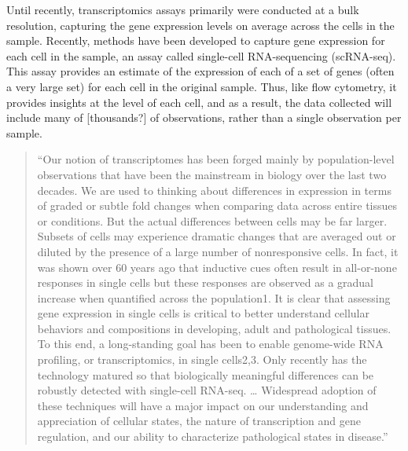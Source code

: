 \documentclass[
]{book}
\begin{document}
Until recently, transcriptomics assays primarily were conducted at a
bulk resolution, capturing the gene expression levels on average across the
cells in the sample. Recently, methods have been developed to capture
gene expression for each cell in the sample, an assay called single-cell
RNA-sequencing (scRNA-seq). This assay provides an estimate of the expression
of each of a set of genes (often a very large set) for each cell in the
original sample. Thus, like flow cytometry, it provides insights at the
level of each cell, and as a result, the data collected will include many
of {[}thousands?{]} of observations, rather than a single observation per
sample.

\begin{quote}
``Our notion of transcriptomes has been forged mainly by population-level
observations that have been the mainstream in biology over the last two decades.
We are used to thinking about differences in expression in terms of graded or
subtle fold changes when comparing data across entire tissues or conditions. But
the actual differences between cells may be far larger. Subsets of cells may
experience dramatic changes that are averaged out or diluted by the presence of
a large number of nonresponsive cells. In fact, it was shown over 60 years ago
that inductive cues often result in all-or-none responses in single cells but
these responses are observed as a gradual increase when quantified across the
population1. It is clear that assessing gene expression in single cells is
critical to better understand cellular behaviors and compositions in developing,
adult and pathological tissues. To this end, a long-standing goal has been to
enable genome-wide RNA profiling, or transcriptomics, in single cells2,3. Only
recently has the technology matured so that biologically meaningful differences
can be robustly detected with single-cell RNA-seq. \ldots{} Widespread adoption of
these techniques will have a major impact on our understanding and appreciation
of cellular states, the nature of transcription and gene regulation, and our
ability to characterize pathological states in disease.'' \citep{sandberg2014entering}
\end{quote}
\end{document}
